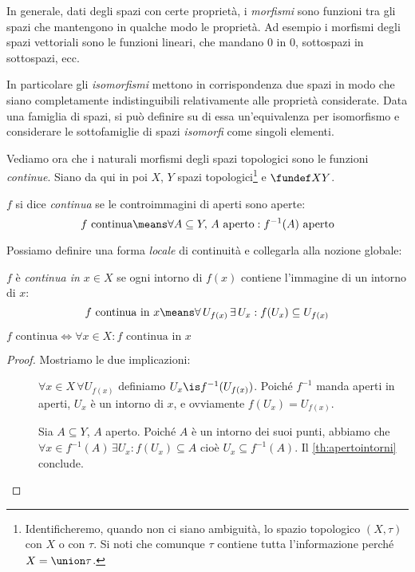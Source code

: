 
In generale, dati degli spazi con certe proprietà, i \emph{morfismi} sono funzioni tra gli spazi che mantengono in qualche modo le proprietà. Ad esempio i morfismi degli spazi vettoriali sono le funzioni lineari, che mandano 0 in 0, sottospazi in sottospazi, ecc.

In particolare gli \emph{isomorfismi} mettono in corrispondenza due spazi in modo che siano completamente indistinguibili relativamente alle proprietà considerate. Data una famiglia di spazi, si può definire su di essa un'equivalenza per isomorfismo e considerare le sottofamiglie di spazi \emph{isomorfi} come singoli elementi.

Vediamo ora che i naturali morfismi degli spazi topologici sono le funzioni \emph{continue}. Siano da qui in poi $X$, $Y$ spazi topologici\footnote{Identificheremo, quando non ci siano ambiguità, lo spazio topologico $(X,\tau)$ con $X$ o con $\tau$. Si noti che comunque $\tau$ contiene tutta l'informazione perché $X=\union\tau$.} e $\fundef XY$.

\begin{defn}[Continuità]
	$f$ si dice \emph{continua} se le controimmagini di aperti sono aperte:
	\[f\text{ continua}\means
	\forall A\subseteq Y,\,A\text{ aperto}:f^{-1}(A)\text{ aperto}\]
\end{defn}

Possiamo definire una forma \emph{locale} di continuità e collegarla alla nozione globale:

\begin{defn}
	$f$ è \emph{continua in $x\in X$} se ogni intorno di $f(x)$ contiene l'immagine di un intorno di $x$:
	\[f\text{ continua in }x\means
	\forall\, U_{f(x)}\,\exists\, U_x:f(U_x)\subseteq U_{f(x)}\]
\end{defn}

\begin{prop}
	$f\text{ continua}\iff\forall x\in X:f\text{ continua in }x$
\end{prop}

\begin{proof}
	Mostriamo le due implicazioni:
	\begin{description}
		\item[\proofrightarrow]
			$\forall x\in X\,\forall U_{f(x)}$ definiamo $U_x\is f^{-1}(U_{f(x)})$.
			Poiché $f^{-1}$ manda aperti in aperti, $U_x$ è un intorno di $x$,
			e ovviamente $f(U_x)=U_{f(x)}$.
		\item[\proofleftarrow]
			Sia  $A\subseteq Y$, $A$ aperto.
			Poiché $A$ è un intorno dei suoi punti, abbiamo che
			$\forall x\in f^{-1}(A)\,\exists U_x:f(U_x)\subseteq A$ cioè
			$U_x\subseteq f^{-1}(A)$.
			Il \autoref{th:apertointorni} conclude.
			\qedhere
	\end{description}
\end{proof}

